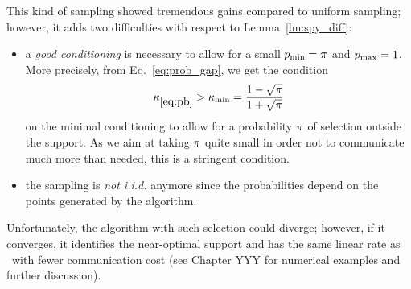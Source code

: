 This kind of sampling showed tremendous gains compared to uniform sampling; however, it adds two difficulties with respect to Lemma~\ref{lm:spy_diff}:
\begin{itemize}
    \item a \emph{good conditioning} is necessary to allow for a small $p_{\min}=\pi$ and $p_{\max}=1$. More precisely, from Eq.~\eqref{eq:prob_gap}, we get the condition
    \begin{equation}\label{eq:kappamin}
        \kappa_{\eqref{eq:pb}} > \kappa_{\min} = \frac{1-\sqrt{\pi}}{1+\sqrt{\pi}}
    \end{equation}
    on the minimal conditioning to allow for a probability $\pi$ of selection outside the support. As we aim at taking $\pi$ quite small in order not to communicate much more than needed, this is a stringent condition.
    \item the sampling is \emph{not i.i.d.} anymore since the probabilities depend on the points generated by the algorithm.
\end{itemize}

Unfortunately, the algorithm with such selection could diverge; however, if it converges, it identifies the near-optimal support and has the same linear rate as \dave~with fewer communication cost  (see Chapter YYY for numerical examples and further discussion).

